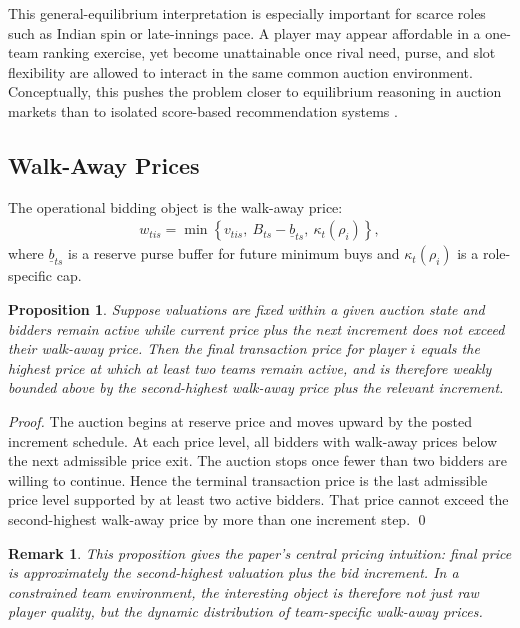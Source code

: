 \documentclass[11pt]{article}
\newtheorem{proposition}{Proposition}
\newtheorem{remark}{Remark}
\begin{document}
This general-equilibrium interpretation is especially important for scarce roles such as Indian spin or late-innings pace. A player may appear affordable in a one-team ranking exercise, yet become unattainable once rival need, purse, and slot flexibility are allowed to interact in the same common auction environment. Conceptually, this pushes the problem closer to equilibrium reasoning in auction markets than to isolated score-based recommendation systems \citep{klemperer2004,krishna2009}.

\subsection{Walk-Away Prices}

The operational bidding object is the walk-away price:
\begin{align}
w_{tis}=\min\left\{v_{tis},\ B_{ts}-\underline{b}_{ts},\ \kappa_t(\rho_i)\right\},
\end{align}
where \(\underline{b}_{ts}\) is a reserve purse buffer for future minimum buys and \(\kappa_t(\rho_i)\) is a role-specific cap.

\begin{proposition}
Suppose valuations are fixed within a given auction state and bidders remain active while current price plus the next increment does not exceed their walk-away price. Then the final transaction price for player \(i\) equals the highest price at which at least two teams remain active, and is therefore weakly bounded above by the second-highest walk-away price plus the relevant increment.
\end{proposition}

\begin{proof}
The auction begins at reserve price and moves upward by the posted increment schedule. At each price level, all bidders with walk-away prices below the next admissible price exit. The auction stops once fewer than two bidders are willing to continue. Hence the terminal transaction price is the last admissible price level supported by at least two active bidders. That price cannot exceed the second-highest walk-away price by more than one increment step. \qed
\end{proof}

\begin{remark}
This proposition gives the paper's central pricing intuition: final price is approximately the second-highest valuation plus the bid increment. In a constrained team environment, the interesting object is therefore not just raw player quality, but the dynamic distribution of team-specific walk-away prices.
\end{remark}
\end{document}
